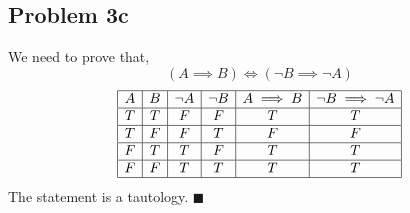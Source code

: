 \documentclass[answers]{exam}
\theoremstyle{mytheoremstyle}
\theoremstyle{mytheoremstyle}
\theoremstyle{myproblemstyle}
\begin{document}
\subsection*{Problem 3c}
\begin{framed}
	We need to prove that,
	\[(A\implies B) \iff (\lnot B\implies\lnot A)\]
	\begin{displaymath}
		\begin{array}{|c|c|c|c|c|c|}
			\hline
			A & B & \lnot A & \lnot B & A\implies B & \lnot B\implies \lnot A \\\hline
			T & T & F       & F       & T           & T                       \\\hline
			T & F & F       & T       & F           & F                       \\\hline
			F & T & T       & F       & T           & T                       \\\hline
			F & F & T       & T       & T           & T                       \\\hline
		\end{array}
	\end{displaymath}
	The statement is a tautology. \(\blacksquare\)
\end{framed}
\end{document}
